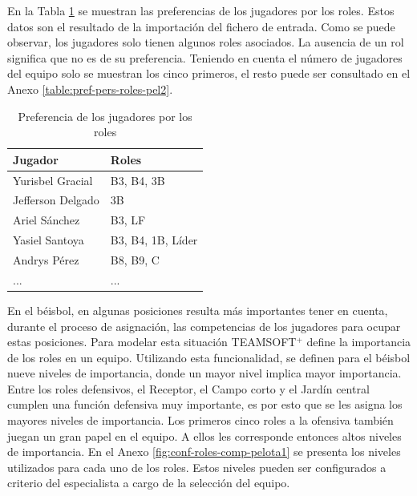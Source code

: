 En la Tabla \ref{table:pref-pers-roles-pel} se muestran las preferencias de los jugadores por los roles. Estos datos son el resultado de la importación del fichero de entrada. Como se puede observar, los jugadores solo tienen algunos roles asociados. La ausencia de un rol significa que no es de su preferencia. Teniendo en cuenta el número de jugadores del equipo solo se muestran los cinco primeros, el resto puede ser consultado en el Anexo \ref{table:pref-pers-roles-pel2}.

\begin{table}[H]
	\centering
	\caption{Preferencia de los jugadores por los roles}\label{table:pref-pers-roles-pel}
		\begin{tabular}{l l }
			\toprule
			\textbf{Jugador}  & \textbf{Roles}             \\ \midrule
			Yurisbel Gracial  & B3, B4, 3B        \\ \hline
			Jefferson Delgado & 3B                \\ \hline
			Ariel Sánchez     & B3, LF            \\ \hline
			Yasiel Santoya    & B3, B4, 1B, Líder \\ \hline
			Andrys Pérez      & B8, B9, C         \\ \hline
			...               & ...               \\ \bottomrule
		\end{tabular}
\end{table}

En el béisbol, en algunas posiciones resulta más importantes tener en cuenta, durante el proceso de asignación, las competencias de los jugadores para ocupar estas posiciones. Para modelar esta situación TEAMSOFT$^+$ define la importancia de los roles en un equipo. Utilizando esta funcionalidad, se definen para el béisbol nueve niveles de importancia, donde un mayor nivel implica mayor importancia. Entre los roles defensivos, el Receptor, el Campo corto y el Jardín central cumplen una función defensiva muy importante, es por esto que se les asigna los mayores niveles de importancia. Los primeros cinco roles a la ofensiva también juegan un gran papel en el equipo. A ellos les corresponde entonces altos niveles de importancia. En el Anexo \ref{fig:conf-roles-comp-pelota1} se presenta los niveles utilizados para cada uno de los roles. Estos niveles pueden ser configurados a criterio del especialista a cargo de la selección del equipo.	\\

